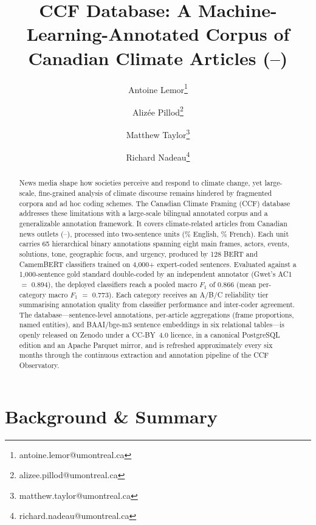 \documentclass[12pt]{article}
\title{\textbf{CCF Database: A Machine-Learning-Annotated Corpus of \CCFarticles{} Canadian Climate Articles (\CCFyearfirst{}--\CCFyearlast{})}}
\author[1]{Antoine Lemor\thanks{antoine.lemor@umontreal.ca}}
\author[2]{Alizée Pillod\thanks{alizee.pillod@umontreal.ca}}
\author[2]{Matthew Taylor\thanks{matthew.taylor@umontreal.ca}}
\author[2]{Richard Nadeau\thanks{richard.nadeau@umontreal.ca}}
\affil[1]{Université de Sherbrooke}
\affil[2]{Université de Montréal}
\date{}
\renewcommand\_{\texttt{\detokenize{_}\allowbreak}}
\begin{document}
\maketitle
\thispagestyle{empty}


\begin{abstract}
\noindent
News media shape how societies perceive and respond to climate change, yet large-scale, fine-grained analysis of climate discourse remains hindered by fragmented corpora and ad hoc coding schemes. The Canadian Climate Framing (CCF) database addresses these limitations with a large-scale bilingual annotated corpus and a generalizable annotation framework. It covers \CCFarticles{} climate-related articles from \CCFnewspapers{} Canadian news outlets (\CCFyearfirst{}--\CCFyearlast{}), processed into \CCFsentences{} two-sentence units (\CCFenshare{}\% English, \CCFfrshare{}\% French). Each unit carries 65 hierarchical binary annotations spanning eight main frames, actors, events, solutions, tone, geographic focus, and urgency, produced by 128 BERT and CamemBERT classifiers trained on 4{,}000+ expert-coded sentences. Evaluated against a 1{,}000-sentence gold standard double-coded by an independent annotator (Gwet's AC1 $=$ 0.894), the deployed classifiers reach a pooled macro $F_1$ of 0.866 (mean per-category macro $F_1$ $=$ 0.773). Each category receives an A/B/C reliability tier summarising annotation quality from classifier performance and inter-coder agreement. The database---sentence-level annotations, per-article aggregations (frame proportions, named entities), and \CCFembeddings{} BAAI/bge-m3 sentence embeddings in six relational tables---is openly released on Zenodo under a CC-BY~4.0 licence, in a canonical PostgreSQL edition and an Apache Parquet mirror, and is refreshed approximately every six months through the continuous extraction and annotation pipeline of the CCF Observatory.
\end{abstract}

\newpage

\section{Background \& Summary}
\end{document}
